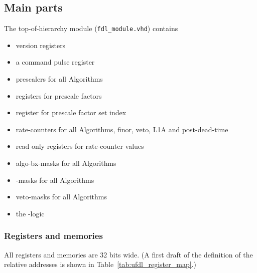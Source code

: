 \subsection{Main parts}

The top-of-hierarchy module (\texttt{fdl\_module.vhd}) contains
\begin {itemize}
\item version registers
\item a command pulse register
\item prescalers for all Algorithms
\item registers for prescale factors
\item register for prescale factor set index
\item rate-counters for all Algorithms, finor, veto, L1A and post-dead-time
\item read only registers for rate-counter values
\item algo-bx-masks for all Algorithms
\item \finor-masks for all Algorithms
\item veto-masks for all Algorithms
\item the \finor-logic
\end {itemize}

%
%
\subsubsection{Registers and memories}
\label{sec:fdl:reg_mem}

All registers and memories are 32 bits wide. (A first draft of the definition of the relative addresses is shown in Table~\ref{tab:ufdl_register_map}.)

